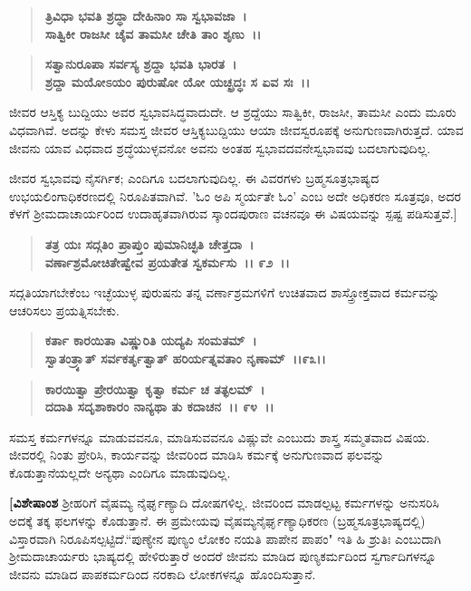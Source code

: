 \begin{verse}
\textbf{ತ್ರಿವಿಧಾ ಭವತಿ ಶ್ರದ್ಧಾ ದೇಹಿನಾಂ ಸಾ ಸ್ವಭಾವಜಾ~।}\\\textbf{ಸಾತ್ವಿಕೀ ರಾಜಸೀ ಚೈವ ತಾಮಸೀ ಚೇತಿ ತಾಂ ಶೃಣು~।।}
\end{verse}

\begin{verse}
\textbf{ಸತ್ವಾನುರೂಪಾ ಸರ್ವಸ್ಯ ಶ್ರದ್ದಾ ಭವತಿ ಭಾರತ~।}\\\textbf{ಶ್ರದ್ದಾ ಮಯೋಽಯಂ ಪುರುಷೋ ಯೋ ಯಚ್ಛ್ರದ್ಧಃ ಸ ಏವ ಸಃ~।।} 
\end{verse}

ಜೀವರ ಆಸ್ತಿಕ್ಯ ಬುದ್ದಿಯು ಅವರ ಸ್ವಭಾವಸಿದ್ಧವಾದುದೇ. ಆ ಶ್ರದ್ದೆಯು ಸಾತ್ವಿಕೀ, ರಾಜಸೀ, ತಾಮಸೀ ಎಂದು ಮೂರು ವಿಧವಾಗಿವೆ. ಅದನ್ನು ಕೇಳು  ಸಮಸ್ತ ಜೀವರ ಆಸ್ತಿಕ್ಯಬುದ್ದಿಯು ಆಯಾ ಜೀವಸ್ವರೂಪಕ್ಕೆ ಅನುಗುಣವಾಗಿರುತ್ತದೆ. ಯಾವ ಜೀವನು ಯಾವ ವಿಧವಾದ ಶ್ರದ್ಧೆಯುಳ್ಳವನೋ ಅವನು ಅಂತಹ ಸ್ವಭಾವದವನೇಸ್ವಭಾವವು ಬದಲಾಗುವುದಿಲ್ಲ.

ಜೀವರ ಸ್ವಭಾವವು ನೈಸರ್ಗಿಕ; ಎಂದಿಗೂ ಬದಲಾಗುವುದಿಲ್ಲ. ಈ ವಿವರಗಳು ಬ್ರಹ್ಮಸೂತ್ರಭಾಷ್ಯದ ಉಭಯಲಿಂಗಾಧಿಕರಣದಲ್ಲಿ ನಿರೂಪಿತವಾಗಿವೆ. 'ಓಂ ಅಪಿ ಸ್ಮರ್ಯತೇ ಓಂ' ಎಂಬ ಅದೇ ಅಧಿಕರಣ ಸೂತ್ರವೂ, ಅದರ ಕೆಳಗೆ ಶ‍್ರೀಮದಾಚಾರ್ಯರಿಂದ ಉದಾಹೃತವಾಗಿರುವ ಸ್ಕಾಂದಪುರಾಣ ವಚನವೂ ಈ ವಿಷಯವನ್ನು ಸ್ಪಷ್ಟ ಪಡಿಸುತ್ತವೆ.]

\begin{verse}
\textbf{ತತ್ರ ಯಃ ಸದ್ಗತಿಂ ಪ್ರಾಪ್ತುಂ ಪುಮಾನಿಚ್ಛತಿ ಚೇತ್ತದಾ~।}\\\textbf{ವರ್ಣಾಶ್ರಮೋಚಿತೇಷ್ವೇವ ಪ್ರಯತೇತ ಸ್ವಕರ್ಮಸು~।। ೯೨~।।}
\end{verse}

ಸದ್ಗತಿಯಾಗಬೇಕೆಂಬ ಇಚ್ಛೆಯುಳ್ಳ ಪುರುಷನು ತನ್ನ ವರ್ಣಾಶ್ರಮಗಳಿಗೆ ಉಚಿತವಾದ ಶಾಸ್ತ್ರೋಕ್ತವಾದ ಕರ್ಮವನ್ನು ಆಚರಿಸಲು ಪ್ರಯತ್ನಿಸಬೇಕು.

\begin{verse}
\textbf{ಕರ್ತಾ ಕಾರಯಿತಾ ವಿಷ್ಣುರಿತಿ ಯದ್ಯಪಿ ಸಂಮತಮ್~।}\\\textbf{ಸ್ವಾತಂತ್ರ್ಯಾತ್ ಸರ್ವಕರ್ತೃತ್ವಾತ್ ಹರಿರ್ಯತ್ನವತಾಂ ನೃಣಾಮ್~।।೯೩।। }
\end{verse}

\begin{verse}
\textbf{ಕಾರಯಿತ್ವಾ ಪ್ರೇರಯಿತ್ವಾ ಕೃತ್ವಾ ಕರ್ಮ ಚ ತತ್ಫಲಮ್~।}\\\textbf{ದದಾತಿ ಸದೃಶಾಕಾರಂ ನಾನ್ಯಥಾ ತು ಕದಾಚನ~।। ೯೪~।।}
\end{verse}

ಸಮಸ್ತ ಕರ್ಮಗಳನ್ನೂ ಮಾಡುವವನೂ, ಮಾಡಿಸುವವನೂ ವಿಷ್ಣುವೇ ಎಂಬುದು ಶಾಸ್ತ್ರ ಸಮ್ಮತವಾದ ವಿಷಯ. ಜೀವರಲ್ಲಿ ನಿಂತು ಪ್ರೇರಿಸಿ, ಕಾರ್ಯವನ್ನು ಜೀವರಿಂದ ಮಾಡಿಸಿ ಕರ್ಮಕ್ಕೆ ಅನುಗುಣವಾದ ಫಲವನ್ನು ಕೊಡುತ್ತಾನೆಯಲ್ಲದೇ ಅನ್ಯಥಾ ಎಂದಿಗೂ ಮಾಡುವುದಿಲ್ಲ.

\textbf{[ವಿಶೇಷಾಂಶ} ಶ‍್ರೀಹರಿಗೆ ವೈಷಮ್ಯ ನೈರ್ಘೃಣ್ಯಾದಿ ದೋಷಗಳಿಲ್ಲ. ಜೀವರಿಂದ ಮಾಡಲ್ಪಟ್ಟ ಕರ್ಮಗಳನ್ನು ಅನುಸರಿಸಿ ಅದಕ್ಕೆ ತಕ್ಕ ಫಲಗಳನ್ನು ಕೊಡುತ್ತಾನೆ. ಈ ಪ್ರಮೇಯವು ವೈಷಮ್ಯನೈರ್ಘೃಣ್ಯಾಧಿಕರಣ (ಬ್ರಹ್ಮಸೂತ್ರಭಾಷ್ಯದಲ್ಲಿ) ವಿಸ್ತಾರವಾಗಿ ನಿರೂಪಿಸಲ್ಪಟ್ಟಿದೆ.\break “ಪುಣ್ಯೇನ ಪುಣ್ಯಂ ಲೋಕಂ ನಯತಿ ಪಾಪೇನ ಪಾಪಂ" ಇತಿ ಹಿ ಶ್ರುತಿಃ ಎಂಬುದಾಗಿ ಶ‍್ರೀಮದಾಚಾರ್ಯರು ಭಾಷ್ಯದಲ್ಲಿ ಹೇಳಿರುತ್ತಾರೆ ಅಂದರೆ ಜೀವನು ಮಾಡಿದ ಪುಣ್ಯಕರ್ಮದಿಂದ ಸ್ವರ್ಗಾದಿಗಳನ್ನೂ ಜೀವನು ಮಾಡಿದ ಪಾಪಕರ್ಮದಿಂದ ನರಕಾದಿ ಲೋಕಗಳನ್ನೂ ಹೊಂದಿಸುತ್ತಾನೆ.

